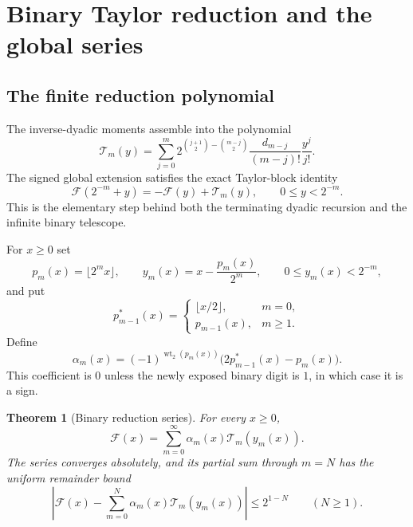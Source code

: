 \documentclass[11pt,oneside]{article}
\newtheorem{theorem}{Theorem}[section]
\theoremstyle{definition}
\theoremstyle{remark}
\newcommand{\wt}{\operatorname{wt}_2}
\begin{document}
\section{Binary Taylor reduction and the global series}
\label{sec:binary}

\subsection{The finite reduction polynomial}

The inverse-dyadic moments assemble into the polynomial
\begin{equation}
 \mathcal T_m(y)=
 \sum_{j=0}^{m}
 2^{\binom{j+1}{2}-\binom{m-j}{2}}
 \frac{d_{m-j}}{(m-j)!}\frac{y^j}{j!}.                    \label{eq:T-def-local}
\end{equation}
The signed global extension satisfies the exact Taylor-block identity
\begin{equation}
 \mathcal F(2^{-m}+y)=-\mathcal F(y)+\mathcal T_m(y),
 \qquad 0\le y<2^{-m}.                                    \label{eq:T-reduction-local}
\end{equation}
This is the elementary step behind both the terminating dyadic recursion and the infinite
binary telescope.

For $x\ge0$ set
\begin{equation}
 p_m(x)=\lfloor2^mx\rfloor,
 \qquad
 y_m(x)=x-\frac{p_m(x)}{2^m},
 \qquad 0\le y_m(x)<2^{-m},                               \label{eq:prefix-tail-local}
\end{equation}
and put
\begin{equation}
 p^*_{m-1}(x)=
 \begin{cases}
 \lfloor x/2\rfloor,&m=0,\\
 p_{m-1}(x),&m\ge1.
 \end{cases}                                               \label{eq:previous-prefix-local}
\end{equation}
Define
\begin{equation}
 \alpha_m(x)=(-1)^{\wt(p_m(x))}
 \bigl(2p^*_{m-1}(x)-p_m(x)\bigr).                         \label{eq:alpha-local}
\end{equation}
This coefficient is $0$ unless the newly exposed binary digit is $1$, in which case it is a
sign.

\begin{theorem}[Binary reduction series]
\label{thm:binary-series-local}
For every $x\ge0$,
\begin{equation}
 \boxed{
 \mathcal F(x)=\sum_{m=0}^{\infty}
 \alpha_m(x)\mathcal T_m(y_m(x)).}                        \label{eq:binary-series-local}
\end{equation}
The series converges absolutely, and its partial sum through $m=N$ has the uniform remainder
bound
\begin{equation}
 \left|\mathcal F(x)-\sum_{m=0}^{N}
 \alpha_m(x)\mathcal T_m(y_m(x))\right|\le2^{1-N}
 \qquad(N\ge1).                                           \label{eq:binary-tail-local}
\end{equation}
\end{theorem}
\end{document}
